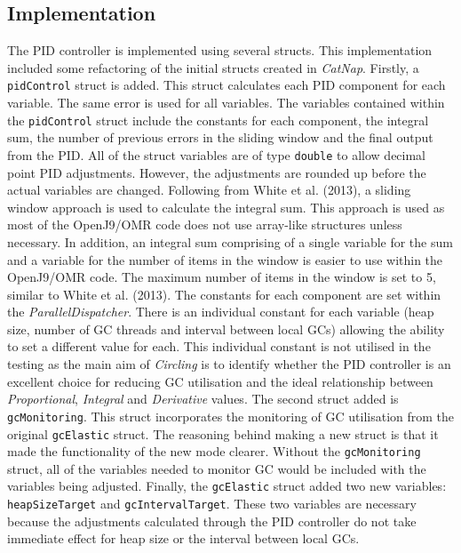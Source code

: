 \subsection{Implementation}
The PID controller is implemented using several structs. This
implementation included some refactoring of the initial structs created
in \emph{CatNap}. Firstly, a \verb|pidControl| struct is added. This struct calculates
each PID component for each variable. The same error is used for all
variables. The variables contained within the \verb|pidControl| struct include
the constants for each component, the integral sum, the number of previous
errors in the sliding window and the final output from the PID. All of the
struct variables are of type \verb|double| to allow decimal point PID adjustments.
However, the adjustments are rounded up before the actual variables are
changed. Following from White et al. (2013), a sliding window approach
is used to calculate the integral sum. This approach is used as most of
the OpenJ9/OMR code does not use array-like structures unless necessary.
In addition, an integral sum comprising of a single variable for the sum and a variable for the number of items in the window is easier to use within the OpenJ9/OMR code. The maximum number of items in the window is set to 5, similar
to White et al. (2013). The constants for each component are set within
the \emph{ParallelDispatcher}. There is an individual constant for each
variable (heap size, number of GC threads and interval between local
GCs) allowing the ability to set a different value for each. This
individual constant is not utilised in the testing as the main aim of
\emph{Circling} is to identify whether the PID controller is an excellent
choice for reducing GC utilisation and the ideal relationship between
\emph{Proportional}, \emph{Integral} and \emph{Derivative} values.
\newline\newline
The second struct added is \verb|gcMonitoring|. This struct incorporates the
monitoring of GC utilisation from the original \verb|gcElastic| struct. The
reasoning behind making a new struct is that it made the functionality
of the new mode clearer. Without the \verb|gcMonitoring| struct, all of the
variables needed to monitor GC would be included with the variables
being adjusted. Finally, the \verb|gcElastic| struct added two new variables:
\verb|heapSizeTarget| and \verb|gcIntervalTarget|. These two variables are necessary
because the adjustments calculated through the PID controller do not
take immediate effect for heap size or the interval between local GCs.
